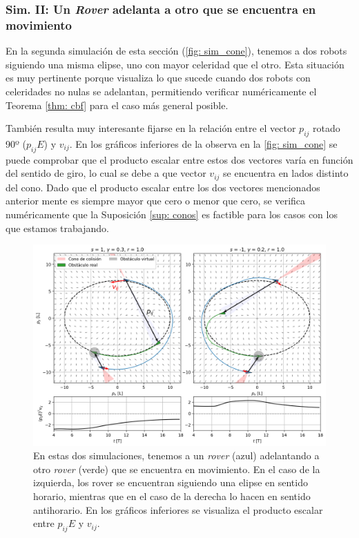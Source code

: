 \subsubsection*{Sim. II: Un \textit{Rover} adelanta a otro que se encuentra en movimiento}

En la segunda simulación de esta sección (\autoref{fig: sim_cone}), tenemos a dos robots siguiendo una misma elipse, uno con mayor celeridad que el otro. Esta situación es muy pertinente porque visualiza lo que sucede cuando dos robots con celeridades no nulas se adelantan, permitiendo verificar numéricamente el Teorema \ref{thm: cbf} para el caso más general posible.

También resulta muy interesante fijarse en la relación entre el vector $p_{ij}$ rotado 90º ($p_{ij}E$) y $v_{ij}$. En los gráficos inferiores de la observa en la \autoref{fig: sim_cone} se puede comprobar que el producto escalar entre estos dos vectores varía en función del sentido de giro, lo cual se debe a que vector $v_{ij}$ se encuentra en lados distinto del cono. Dado que el producto escalar entre los dos vectores mencionados anterior mente es siempre mayor que cero o menor que cero, se verifica numéricamente que la Suposición \ref{sup: conos} es factible para los casos con los que estamos trabajando.

\begin{figure}[h!]
    \centering
    \includegraphics[trim={0 0cm 0 -1cm}, clip, width=1\textwidth]{fig/sim_cone.png}
    \caption{En estas dos simulaciones, tenemos a un \textit{rover} (azul) adelantando a otro \textit{rover} (verde) que se encuentra en movimiento. En el caso de la izquierda, los rover se encuentran siguiendo una elipse en sentido horario, mientras que en el caso de la derecha lo hacen en sentido antihorario. En los gráficos inferiores se visualiza el producto escalar entre $p_{ij}E$ y $v_{ij}$.}
    \label{fig: sim_cone}
\end{figure}
\newpage

